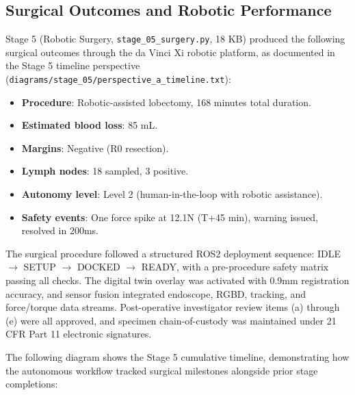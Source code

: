\documentclass{article}
\begin{document}
\subsection{Surgical Outcomes and Robotic Performance}

Stage 5 (Robotic Surgery, \texttt{stage\_05\_surgery.py}, 18 KB) produced the following surgical outcomes through the da Vinci Xi robotic platform, as documented in the Stage 5 timeline perspective (\texttt{diagrams/stage\_05/perspective\_a\_timeline.txt}):

\begin{itemize}[leftmargin=*]
\item \textbf{Procedure}: Robotic-assisted lobectomy, 168 minutes total duration.
\item \textbf{Estimated blood loss}: 85 mL.
\item \textbf{Margins}: Negative (R0 resection).
\item \textbf{Lymph nodes}: 18 sampled, 3 positive.
\item \textbf{Autonomy level}: Level 2 (human-in-the-loop with robotic assistance).
\item \textbf{Safety events}: One force spike at 12.1N (T+45 min), warning issued, resolved in 200ms.
\end{itemize}

The surgical procedure followed a structured ROS2 deployment sequence: IDLE $\rightarrow$ SETUP $\rightarrow$ DOCKED $\rightarrow$ READY, with a pre-procedure safety matrix passing all checks. The digital twin overlay was activated with 0.9mm registration accuracy, and sensor fusion integrated endoscope, RGBD, tracking, and force/torque data streams. Post-operative investigator review items (a) through (e) were all approved, and specimen chain-of-custody was maintained under 21 CFR Part 11 electronic signatures.

The following diagram shows the Stage 5 cumulative timeline, demonstrating how the autonomous workflow tracked surgical milestones alongside prior stage completions:

\newpage
\end{document}
